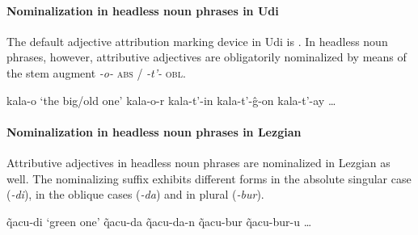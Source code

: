 \paragraph*{Nominalization in headless noun phrases in Udi}
The default adjective attribution marking device in Udi is . In headless noun phrases, however, attributive adjectives are obligatorily nominalized by means of the stem augment \textit{-o-} \textsc{abs} / \textit{-t'-} \textsc{obl}.
\begin{exe}
\settowidth{}
\begin{xlist}
\ex	kala-o		{\rm ‘the big/old one’}	
\ex	kala-o-r						
\ex	kala-t'-in						
\ex	kala-t'-ĝ-on					
\ex	kala-t'-ay						
\ex \dots
\end{xlist}
\end{exe}

\paragraph*{Nominalization in headless noun phrases in Lezgian}
Attributive adjectives in headless noun phrases are nominalized in Lezgian as well. The nominalizing suffix exhibits different forms in the absolute singular case (\textit{-di}), in the oblique cases (\textit{-da}) and in plural (\textit{-bur}).
\begin{exe}
\settowidth{}
\begin{xlist}
\ex	q̃acu-di		{\rm ‘green one’}	
\ex	q̃acu-da						
\ex	q̃acu-da-n						
\ex	q̃acu-bur						
\ex	q̃acu-bur-u					
\ex \dots
\end{xlist}
\end{exe}

